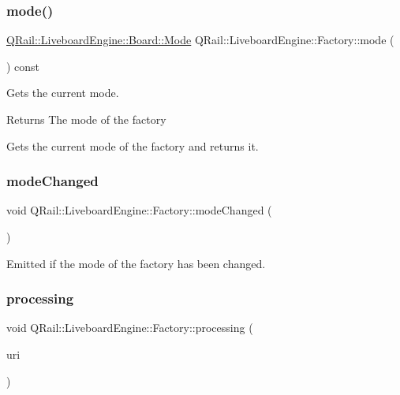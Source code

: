 \subsubsection{\texorpdfstring{mode()}{mode()}}
{\footnotesize\ttfamily \mbox{\hyperlink{classQRail_1_1LiveboardEngine_1_1Board_a0ab6d318f405895f62c6e98cb2d86c6e}{Q\+Rail\+::\+Liveboard\+Engine\+::\+Board\+::\+Mode}} Q\+Rail\+::\+Liveboard\+Engine\+::\+Factory\+::mode (\begin{DoxyParamCaption}{ }\end{DoxyParamCaption}) const}



Gets the current mode. 

\begin{DoxyReturn}{Returns}
The mode of the factory
\end{DoxyReturn}
Gets the current mode of the factory and returns it. \mbox{\label{classQRail_1_1LiveboardEngine_1_1Factory_a77c3c40bf35560a3893a3f162156f41a}} 
\subsubsection{\texorpdfstring{modeChanged}{modeChanged}}
{\footnotesize\ttfamily void Q\+Rail\+::\+Liveboard\+Engine\+::\+Factory\+::mode\+Changed (\begin{DoxyParamCaption}{ }\end{DoxyParamCaption})\hspace{0.3cm}{\ttfamily [signal]}}



Emitted if the mode of the factory has been changed. 

\mbox{\label{classQRail_1_1LiveboardEngine_1_1Factory_ab71b4c2d7d4f99fd4b12b0e92c0d8965}} 
\subsubsection{\texorpdfstring{processing}{processing}}
{\footnotesize\ttfamily void Q\+Rail\+::\+Liveboard\+Engine\+::\+Factory\+::processing (\begin{DoxyParamCaption}\item[{const Q\+Url \&}]{uri }\end{DoxyParamCaption})\hspace{0.3cm}{\ttfamily [signal]}}



